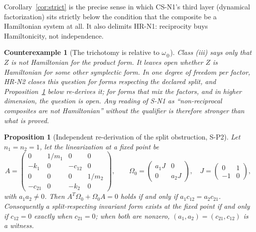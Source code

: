 \documentclass[11pt]{article}
\theoremstyle{plain}
\newtheorem{proposition}[definition]{Proposition}
\newtheorem{counterexample}[definition]{Counterexample}
\begin{document}
Corollary~\ref{cor:strict} is the precise sense in which CS-N1's third layer
(dynamical factorization) sits strictly below the condition that the composite
be a Hamiltonian system at all. It also delimits HR-N1: reciprocity buys
Hamiltonicity, not independence.

\begin{counterexample}[The trichotomy is relative to $\omega_\oplus$]
Class (iii) says only that $Z$ is not Hamiltonian for the \emph{product} form.
It leaves open whether $Z$ is Hamiltonian for some other symplectic form. In one
degree of freedom per factor, HR-N2 closes this question for forms respecting
the declared split, and Proposition~\ref{prop:reprove} below re-derives it; for
forms that mix the factors, and in higher dimension, the question is open. Any
reading of S-N1 as ``non-reciprocal composites are not Hamiltonian'' without the
qualifier is therefore stronger than what is proved.
\end{counterexample}

\begin{proposition}[Independent re-derivation of the split obstruction, S-P2]
\label{prop:reprove}
Let $n_1=n_2=1$, let the linearization at a fixed point be
\[
 A=\begin{pmatrix}
 0 & 1/m_1 & 0 & 0\\
 -k_1 & 0 & -c_{12} & 0\\
 0 & 0 & 0 & 1/m_2\\
 -c_{21} & 0 & -k_2 & 0
 \end{pmatrix},
 \qquad
 \Omega_0=\begin{pmatrix} a_1 J & 0\\ 0 & a_2 J\end{pmatrix},
 \quad J=\begin{pmatrix}0&1\\-1&0\end{pmatrix},
\]
with $a_1a_2\neq0$. Then $A^{T}\Omega_0+\Omega_0A=0$ holds if and only if
$a_1c_{12}=a_2c_{21}$. Consequently a split-respecting invariant form exists at
the fixed point if and only if $c_{12}=0$ exactly when $c_{21}=0$; when both are
nonzero, $(a_1,a_2)=(c_{21},c_{12})$ is a witness.
\end{proposition}
\end{document}
